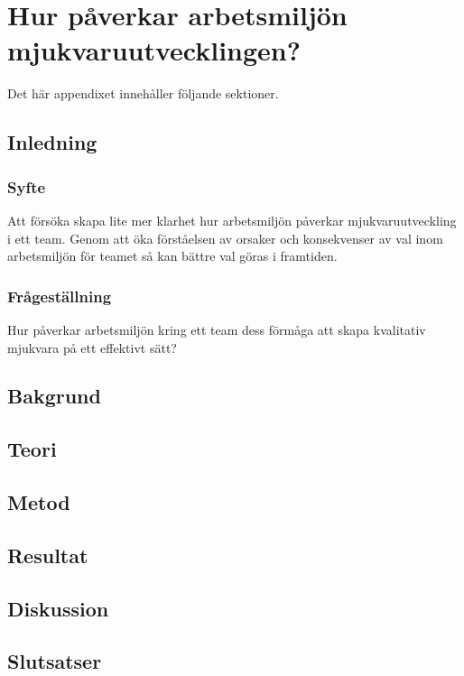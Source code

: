 \chapter{Hur påverkar arbetsmiljön mjukvaruutvecklingen?}
\label{cha:indiv-report-person}

Det här appendixet innehåller följande sektioner.

\section{Inledning}
\label{sec:introduction-person}


\subsection{Syfte}
\label{sec:purpose-person}

Att försöka skapa lite mer klarhet hur  arbetsmiljön påverkar mjukvaruutveckling i ett team. Genom att öka förståelsen av orsaker och konsekvenser av val inom arbetsmiljön för teamet så kan bättre val göras i framtiden.

\subsection{Frågeställning}
\label{sec:issue-person}

Hur påverkar arbetsmiljön kring ett team dess förmåga att skapa kvalitativ mjukvara på ett effektivt sätt?

\section{Bakgrund}
\label{sec:background-person}



\section{Teori}
\label{sec:theory-person}


\section{Metod}
\label{sec:method-person}


\section{Resultat}
\label{sec:results-person}


\section{Diskussion}
\label{sec:discussion-person}


\section{Slutsatser}
\label{sec:conclusions-person}


